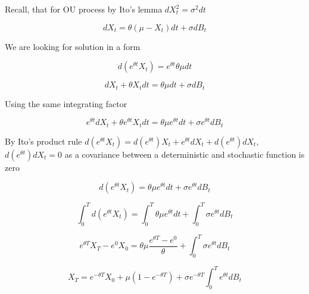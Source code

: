 \documentclass[c, dvipsnames, 8pt]{beamer}
\begin{document}
\begin{frame}[shrink=5]
	
	
	Recall, that for OU process by Ito's lemma $dX_t^2 = \sigma^2 dt  $ 	
	
	\begin{equation}\label{key}
	dX_t = \theta ( \mu  - X_t)  dt + \sigma  d B_t
	\end{equation}
	
	We are looking for solution in a form
	
	
	\begin{equation}\label{key}
	d (e^{\theta t} X_t )    = e^{\theta t}  \theta  \mu   dt 
	\end{equation}
	

	\begin{equation}\label{key}
	dX_t  + \theta  X_t dt = \theta  \mu    dt  + \sigma d B_t
	\end{equation}
	
	Using the same integrating factor
	
	\begin{equation}\label{key}
	e^{\theta t} dX_t  + \theta e^{\theta t}  X_t dt = \theta  \mu e^{\theta t}    dt  + \sigma  e^{\theta t} d B_t
	\end{equation}

	By Ito's product rule $d(e^{\theta t} X_t )  =  d(e^{\theta t}) X_t +   e^{\theta t} d X_t  +  d(e^{\theta t}) d X_t  $,   $d(e^{\theta t}) d X_t  = 0$	as a covariance between a deterministic and stochastic function is zero
	
	
	\begin{equation}\label{key}
	d (e^{\theta t} X_t )    =  \theta  \mu e^{\theta t}    dt  + \sigma  e^{\theta t} d B_t
	\end{equation}
	
	\begin{equation}\label{key}
	\int_0^T d (e^{\theta t} X_t )    = \int_0^T \theta  \mu e^{\theta t}    dt  + \int_0^T \sigma  e^{\theta t} d B_t
	\end{equation}
	
	
	\begin{equation}\label{key}
	e^{\theta T} X_T  -  e^{0} X_0   =  \theta \mu \dfrac{e^{\theta T} - e^{0}  }{\theta}    + \int_0^T \sigma  e^{\theta t} d B_t
	\end{equation}
	
	

	\begin{equation}\label{key}
X_T    =   e^{-\theta T} X_0   +  \mu (1-e^{-\theta T} )     +  \sigma e^{-\theta T} \int_0^T   e^{\theta t} d B_t
\end{equation}
	
\end{frame}
\end{document}
